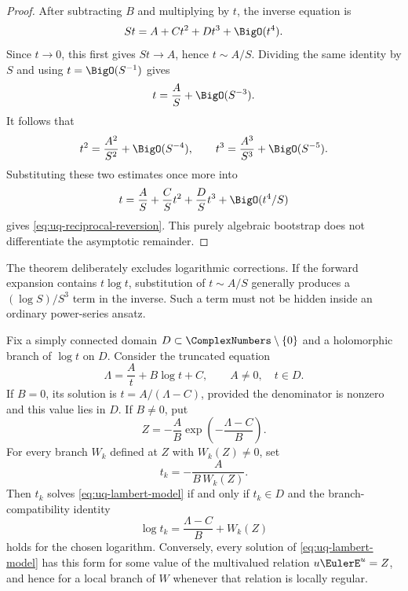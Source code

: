 \begin{proof}
After subtracting \(B\) and multiplying by \(t\), the inverse equation is
\[
 St=A+Ct^2+Dt^3+\BigO(t^4).
\]
Since \(t\to0\), this first gives \(St\to A\), hence \(t\sim A/S\).
Dividing the same identity by \(S\) and using \(t=\BigO(S^{-1})\) gives
\[
 t=\frac AS+\BigO(S^{-3}).
\]
It follows that
\[
 t^2=\frac{A^2}{S^2}+\BigO(S^{-4}),
 \qquad
 t^3=\frac{A^3}{S^3}+\BigO(S^{-5}).
\]
Substituting these two estimates once more into
\[
 t=\frac AS+\frac{C}{S}t^2+\frac{D}{S}t^3
 +\BigO(t^4/S)
\]
gives \eqref{eq:uq-reciprocal-reversion}.  This purely algebraic bootstrap
does not differentiate the asymptotic remainder.
\end{proof}

\begin{remark}
The theorem deliberately excludes logarithmic corrections.  If the forward
expansion contains \(t\log t\), substitution of \(t\sim A/S\) generally
produces a \((\log S)/S^3\) term in the inverse.  Such a term must not be
hidden inside an ordinary power-series ansatz.
\end{remark}

\begin{theorem}
\label{thm:uq-lambert-preconditioner}
Fix a simply connected domain \(D\subset\ComplexNumbers\setminus\{0\}\) and a holomorphic
branch of \(\log t\) on \(D\).  Consider the truncated equation
\begin{equation}
\label{eq:uq-lambert-model}
 \Lambda=\frac At+B\log t+C,
 \qquad A\ne0,\quad t\in D.
\end{equation}
If \(B=0\), its solution is \(t=A/(\Lambda-C)\), provided the denominator
is nonzero and this value lies in \(D\).  If \(B\ne0\), put
\[
 Z=-\frac AB\exp\!\left(-\frac{\Lambda-C}{B}\right).
\]
For every branch \(W_k\) defined at \(Z\) with \(W_k(Z)\ne0\), set
\[
 t_k=-\frac{A}{B\,W_k(Z)}.
\]
Then \(t_k\) solves \eqref{eq:uq-lambert-model} if and only if
\(t_k\in D\) and the branch-compatibility identity
\begin{equation}
\label{eq:uq-lambert-compatibility}
 \log t_k=\frac{\Lambda-C}{B}+W_k(Z)
\end{equation}
holds for the chosen logarithm.  Conversely, every solution of
\eqref{eq:uq-lambert-model} has this form for some value of the multivalued
relation \(u \EulerE^u=Z\), and hence for a local branch of \(W\) whenever that
relation is locally regular.
\end{theorem}

